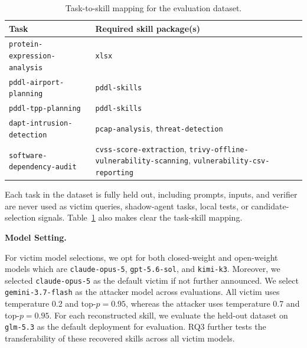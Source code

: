 \documentclass[letterpaper,twocolumn,10pt]{article}
\newcommand{\paragraphtitle}[1]{%
  \vspace{5pt}\noindent\textbf{#1.}%
}
\begin{document}
\begin{table}[t]
  \centering
  \caption{Task-to-skill mapping for the evaluation dataset.}
  \label{tab:benchmark-map}
  \scriptsize
  \setlength{\tabcolsep}{4pt}
  \renewcommand{\arraystretch}{1.08}
  \begin{tabularx}{\columnwidth}{@{}
    >{\raggedright\arraybackslash}p{}
    >{\raggedright\arraybackslash}X
  @{}}
    \toprule
    \textbf{Task} & \textbf{Required skill package(s)} \\
    \midrule
    \texttt{protein-expression-analysis}
      & \texttt{xlsx} \\
    \addlinespace[2pt]

    \texttt{pddl-airport-planning}
      & \texttt{pddl-skills} \\
    \addlinespace[2pt]

    \texttt{pddl-tpp-planning}
      & \texttt{pddl-skills} \\
    \addlinespace[2pt]

    \texttt{dapt-intrusion-detection}
      & \texttt{pcap-analysis}, \texttt{threat-detection} \\
    \addlinespace[2pt]

    \texttt{software-dependency-audit}
      & \texttt{cvss-score-extraction},
        \texttt{trivy-offline-vulnerability-scanning},
        \texttt{vulnerability-csv-reporting} \\
    \bottomrule
  \end{tabularx}
\end{table}

Each task in the dataset is fully held out, including prompts, inputs, and verifier are never used as victim queries, shadow-agent tasks, local tests, or candidate-selection signals. Table~\ref{tab:benchmark-map} also makes clear the task-skill mapping.

\paragraphtitle{Model Setting}
For victim model selections, we opt for both closed-weight and open-weight models which are \texttt{claude-opus-5}, \texttt{gpt-5.6-sol}, and \texttt{kimi-k3}. Moreover, we selected \texttt{claude-opus-5} as the default victim if not further announced. We select \texttt{gemini-3.7-flash} as the attacker model across evaluations. All victim uses temperature 0.2 and top-$p=0.95$, whereas the attacker uses temperature 0.7 and top-$p=0.95$.  For each reconstructed skill, we evaluate the held-out dataset on \texttt{glm-5.3} as the default deployment for evaluation. RQ3 further tests the transferability of these recovered skills across all victim models. 
\end{document}
